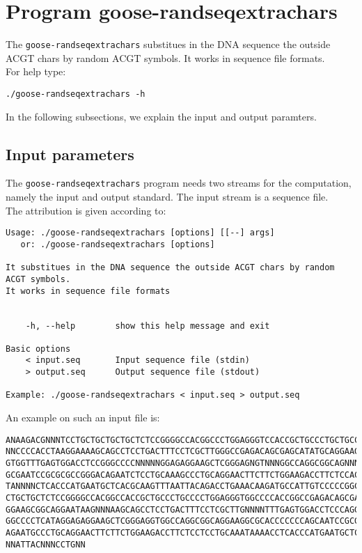 \section{Program goose-randseqextrachars}
The \texttt{goose-randseqextrachars} substitues in the DNA sequence the outside ACGT chars by random ACGT symbols. It works in sequence file formats.\\
For help type:
\begin{lstlisting}
./goose-randseqextrachars -h
\end{lstlisting}
In the following subsections, we explain the input and output paramters.

\subsection*{Input parameters}

The \texttt{goose-randseqextrachars} program needs two streams for the computation,
namely the input and output standard. The input stream is a sequence file.\\
The attribution is given according to:
\begin{lstlisting}
Usage: ./goose-randseqextrachars [options] [[--] args]
   or: ./goose-randseqextrachars [options]

It substitues in the DNA sequence the outside ACGT chars by random ACGT symbols.
It works in sequence file formats


    -h, --help        show this help message and exit

Basic options
    < input.seq       Input sequence file (stdin)
    > output.seq      Output sequence file (stdout)

Example: ./goose-randseqextrachars < input.seq > output.seq
\end{lstlisting}
An example on such an input file is:
\begin{lstlisting}
ANAAGACGNNNTCCTGCTGCTGCTGCTCTCCGGGGCCACGGCCCTGGAGGGTCCACCGCTGCCCTGCTGCCATTGTCCCC
NNCCCCACCTAAGGAAAAGCAGCCTCCTGACTTTCCTCGCTTGGGCCGAGACAGCGAGCATATGCAGGAAGCGGCAGGAA
GTGGTTTGAGTGGACCTCCGGGCCCCNNNNNGGAGAGGAAGCTCGGGAGNGTNNNGGCCAGGCGGCAGNNNNCCAGTGCC
GCGAATCCGCGCGCCGGGACAGAATCTCCTGCAAAGCCCTGCAGGAACTTCTTCTGGAAGACCTTCTCCACCCCCCCAGC
TANNNNCTCACCCATGAATGCTCACGCAAGTTTAATTACAGACCTGAAACAAGATGCCATTGTCCCCCGGCCTCCTGCTG
CTGCTGCTCTCCGGGGCCACGGCCACCGCTGCCCTGCCCCTGGAGGGTGGCCCCACCGGCCGAGACAGCGAGCATATGCA
GGAAGCGGCAGGAATAAGNNNAAGCAGCCTCCTGACTTTCCTCGCTTGNNNNTTTGAGTGGACCTCCCAGGCCAGTGCCG
GGCCCCTCATAGGAGAGGAAGCTCGGGAGGTGGCCAGGCGGCAGGAAGGCGCACCCCCCCAGCAATCCGCGCGCCGGGAC
AGAATGCCCTGCAGGAACTTCTTCTGGAAGACCTTCTCCTCCTGCAAATAAAACCTCACCCATGAATGCTCACGCAAGTT
NNATTACNNNCCTGNN
\end{lstlisting}

